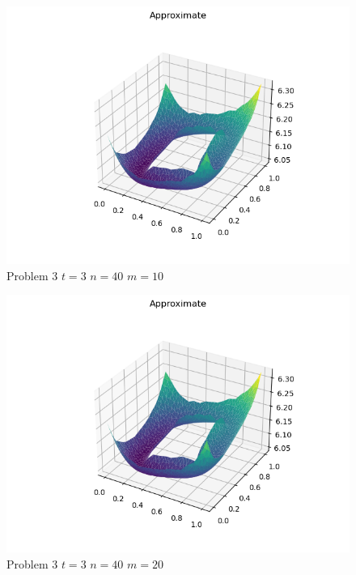 \documentclass{report}
\begin{document}
\begin{figure}[h]
	\caption{Problem 3 $t = 3$ $n = 40$ $m = 10$}
	\includegraphics[width=\textwidth]{example.png}
\end{figure}
\begin{figure}[h]
	\caption{Problem 3 $t = 3$ $n = 40$ $m = 20$}
	\includegraphics[width=\textwidth]{example.png}
\end{figure}
\end{document}
